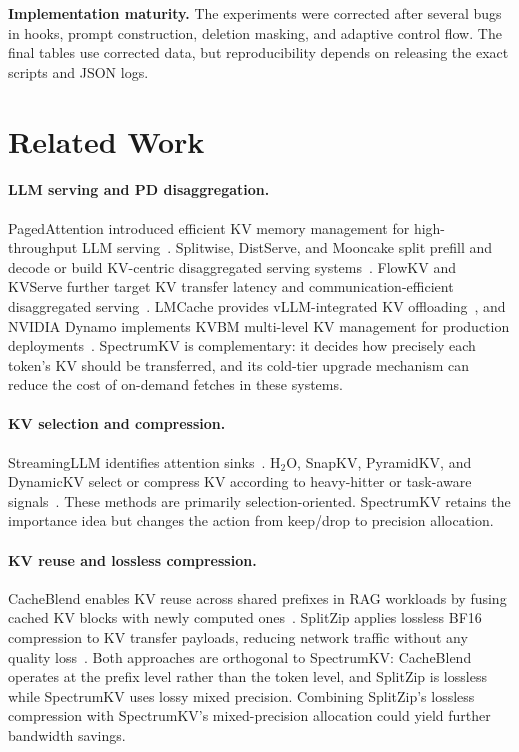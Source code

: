 \documentclass[11pt]{article}
\newcommand{\method}{SpectrumKV}
\theoremstyle{plain}
\theoremstyle{definition}
\begin{document}
\textbf{Implementation maturity.}  The experiments were corrected after several bugs in hooks, prompt construction, deletion masking, and adaptive control flow.  The final tables use corrected data, but reproducibility depends on releasing the exact scripts and JSON logs.

\section{Related Work}
\label{sec:related}

\paragraph{LLM serving and PD disaggregation.}
PagedAttention introduced efficient KV memory management for high-throughput LLM serving~\citep{pagedattention}.  Splitwise, DistServe, and Mooncake split prefill and decode or build KV-centric disaggregated serving systems~\citep{splitwise,distserve,mooncake}.  FlowKV and KVServe further target KV transfer latency and communication-efficient disaggregated serving~\citep{flowkv,kvserve}.  LMCache provides vLLM-integrated KV offloading~\citep{lmcache}, and NVIDIA Dynamo implements KVBM multi-level KV management for production deployments~\citep{nvidiadynamo}.  \method{} is complementary: it decides how precisely each token's KV should be transferred, and its cold-tier upgrade mechanism can reduce the cost of on-demand fetches in these systems.

\paragraph{KV selection and compression.}
StreamingLLM identifies attention sinks~\citep{streamingllm}.  H$_2$O, SnapKV, PyramidKV, and DynamicKV select or compress KV according to heavy-hitter or task-aware signals~\citep{h2o,snapkv,pyramidkv,dynamickv}.  These methods are primarily selection-oriented.  \method{} retains the importance idea but changes the action from keep/drop to precision allocation.

\paragraph{KV reuse and lossless compression.}
CacheBlend enables KV reuse across shared prefixes in RAG workloads by fusing cached KV blocks with newly computed ones~\citep{cacheblend}.  SplitZip applies lossless BF16 compression to KV transfer payloads, reducing network traffic without any quality loss~\citep{splitzip}.  Both approaches are orthogonal to \method{}: CacheBlend operates at the prefix level rather than the token level, and SplitZip is lossless while \method{} uses lossy mixed precision.  Combining SplitZip's lossless compression with \method{}'s mixed-precision allocation could yield further bandwidth savings.
\end{document}
